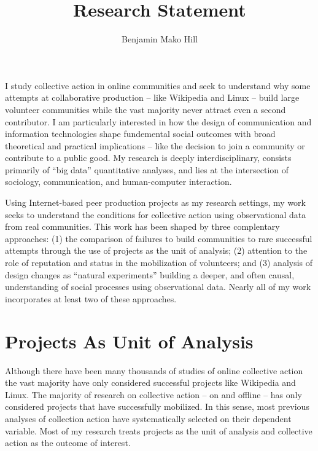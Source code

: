 \documentclass[10pt]{memoir}
\begin{document}
\setlength{\parskip}{4.5pt}

\baselineskip 14.5pt

\title{Research Statement}
\author{Benjamin Mako Hill}

\maketitle

I study collective action in online communities and seek to understand
why some attempts at collaborative production -- like Wikipedia and
Linux -- build large volunteer communities while the vast majority
never attract even a second contributor. I am particularly interested
in how the design of communication and information technologies shape
fundemental social outcomes with broad theoretical and practical
implications -- like the decision to join a community or contribute to
a public good. My research is deeply interdisciplinary, consists
primarily of ``big data'' quantitative analyses, and lies at the
intersection of sociology, communication, and human-computer
interaction.

Using Internet-based peer production projects as my research settings,
my work seeks to understand the conditions for collective action using
observational data from real communities.  This work has been shaped
by three complentary approaches: (1) the comparison of failures to
build communities to rare successful attempts through the use of
projects as the unit of analysis; (2) attention to the role of
reputation and status in the mobilization of volunteers; and (3)
analysis of design changes as ``natural experiments'' building a
deeper, and often causal, understanding of social processes using
observational data. Nearly all of my work incorporates at least two of
these approaches.

\section{Projects As Unit of Analysis}

Although there have been many thousands of studies of online
collective action the vast majority have only considered successful
projects like Wikipedia and Linux.  The majority of research on
collective action -- on and offline -- has only considered projects
that have successfully mobilized. In this sense, most previous
analyses of collection action have systematically selected on their
dependent variable. Most of my research treats projects as the unit of
analysis and collective action as the outcome of interest.
\end{document}
